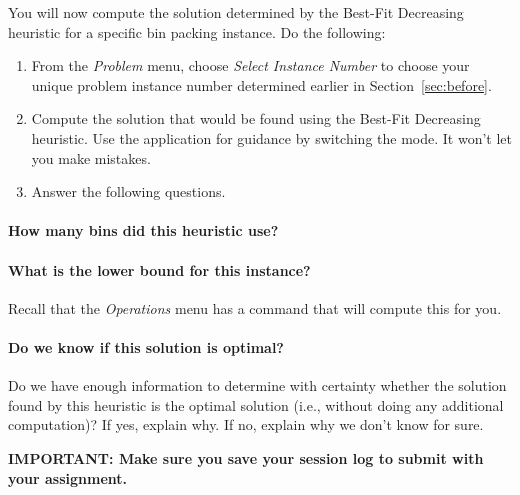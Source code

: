 \documentclass[11pt,letterpaper]{article}
\begin{document}

You will now compute the solution determined by the Best-Fit Decreasing
heuristic for a specific bin packing instance. Do the following:
\begin{enumerate}[leftmargin=*, parsep=0pt, itemsep=2pt, topsep=2pt, partopsep=0pt]
\item From the {\em Problem} menu, choose {\em Select Instance Number}
to choose your unique problem instance number determined earlier in 
Section~\ref{sec:before}.
\item Compute the solution that would be found using the Best-Fit Decreasing
heuristic. Use the application for guidance by switching the mode.
It won't let you make mistakes.
\item Answer the following questions.
\end{enumerate}

\vspace*{-0.25in}

\paragraph*{How many bins did this heuristic use?}

\vspace*{0.25in}

\paragraph*{What is the lower bound for this instance?} Recall that the
{\em Operations} menu has a command that will compute this for you.

\vspace*{0.25in}

\paragraph*{Do we know if this solution is optimal?} Do we have enough 
information to determine with certainty whether the solution found by
this heuristic is the optimal solution (i.e., without doing any additional
computation)? If yes, explain why. If no, explain why we don't know for sure.

\vspace*{0.5in}

\textbf{\large IMPORTANT: Make sure you save your session log to submit with your assignment.}
\end{document}
